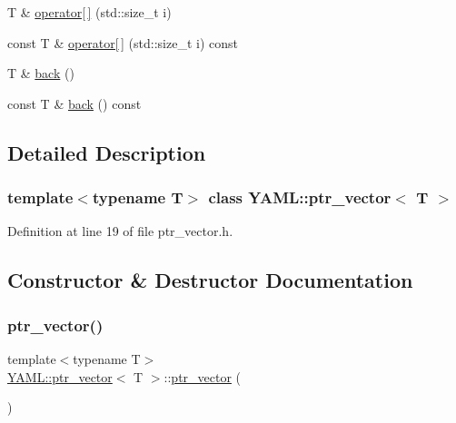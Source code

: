 \begin{DoxyCompactItemize}
\item 
T \& \mbox{\hyperlink{class_y_a_m_l_1_1ptr__vector_a2b773b5df4bf6ecba1416fd86324f021}{operator\mbox{[}$\,$\mbox{]}}} (std\+::size\+\_\+t i)
\item 
const T \& \mbox{\hyperlink{class_y_a_m_l_1_1ptr__vector_afd19e696c84cc30ef0cac8da3e253786}{operator\mbox{[}$\,$\mbox{]}}} (std\+::size\+\_\+t i) const
\item 
T \& \mbox{\hyperlink{class_y_a_m_l_1_1ptr__vector_a6c649d57bf7251486a34e89a0fb4b0be}{back}} ()
\item 
const T \& \mbox{\hyperlink{class_y_a_m_l_1_1ptr__vector_ab99aea297d04fc5133f5695e13006bea}{back}} () const
\end{DoxyCompactItemize}


\subsection{Detailed Description}
\subsubsection*{template$<$typename T$>$\newline
class Y\+A\+M\+L\+::ptr\+\_\+vector$<$ T $>$}



Definition at line 19 of file ptr\+\_\+vector.\+h.



\subsection{Constructor \& Destructor Documentation}
\mbox{\label{class_y_a_m_l_1_1ptr__vector_ae42ba97dcff66ca160a55ad2b7bc3009}} 
\subsubsection{\texorpdfstring{ptr\_vector()}{ptr\_vector()}\hspace{0.1cm}{\footnotesize\ttfamily [1/3]}}
{\footnotesize\ttfamily template$<$typename T$>$ \\
\mbox{\hyperlink{class_y_a_m_l_1_1ptr__vector}{Y\+A\+M\+L\+::ptr\+\_\+vector}}$<$ T $>$\+::\mbox{\hyperlink{class_y_a_m_l_1_1ptr__vector}{ptr\+\_\+vector}} (\begin{DoxyParamCaption}{ }\end{DoxyParamCaption})\hspace{0.3cm}{\ttfamily [inline]}}



